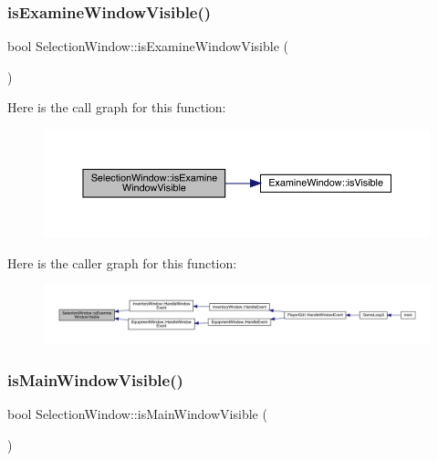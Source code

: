\mbox{\label{class_selection_window_a766ad8cd04212a28a00a365c88c6c3df}} 
\subsubsection{\texorpdfstring{is\+Examine\+Window\+Visible()}{isExamineWindowVisible()}}
{\footnotesize\ttfamily bool Selection\+Window\+::is\+Examine\+Window\+Visible (\begin{DoxyParamCaption}{ }\end{DoxyParamCaption})}

Here is the call graph for this function\+:
\nopagebreak
\begin{figure}[H]
\begin{center}
\leavevmode
\includegraphics[width=350pt]{db/d9c/class_selection_window_a766ad8cd04212a28a00a365c88c6c3df_cgraph}
\end{center}
\end{figure}
Here is the caller graph for this function\+:
\nopagebreak
\begin{figure}[H]
\begin{center}
\leavevmode
\includegraphics[width=350pt]{db/d9c/class_selection_window_a766ad8cd04212a28a00a365c88c6c3df_icgraph}
\end{center}
\end{figure}
\mbox{\label{class_selection_window_a99e0308a6f3478e88e6d5554a59ddb12}} 
\subsubsection{\texorpdfstring{is\+Main\+Window\+Visible()}{isMainWindowVisible()}}
{\footnotesize\ttfamily bool Selection\+Window\+::is\+Main\+Window\+Visible (\begin{DoxyParamCaption}{ }\end{DoxyParamCaption})}

